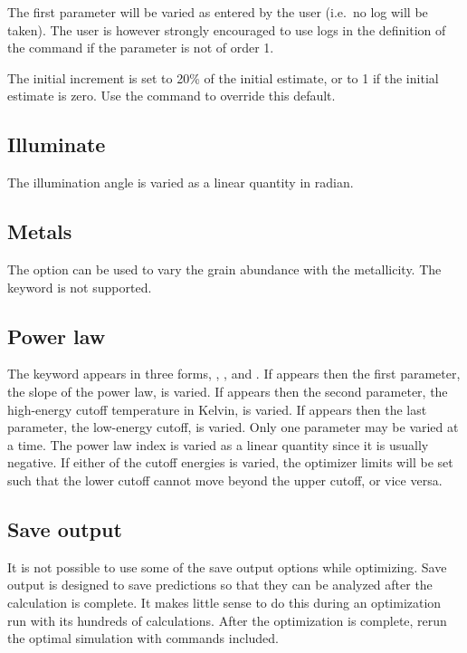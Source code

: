 The first parameter will be varied as entered by the user (i.e.\ no log will
be taken). The user is however strongly encouraged to use logs in the
definition of the command if the parameter is not of order 1.

The initial increment is set to 20\% of the initial estimate, or to 1 if the
initial estimate is zero. Use the  command to
override this default.

\subsection{Illuminate}

The illumination angle is varied as a linear quantity in radian.

\subsection{Metals}

The  option can be used to vary the
grain abundance with the metallicity. 
The keyword  is not supported.

\subsection{Power law}

The  keyword appears in three forms,
, , and .
If
 appears then the first parameter,
the slope of the power law, is varied.
If  appears then the second parameter,
the high-energy cutoff temperature in
Kelvin, is varied.
If  appears then the last parameter, the low-energy
cutoff, is varied.
Only one parameter may be varied at a time. The power law index is
varied as a linear quantity since it is usually negative.
If either of the cutoff energies is varied, the optimizer limits
will be set such that the lower cutoff cannot move beyond the upper
cutoff, or vice versa.

\subsection{Save output}

It is not possible to use some of the save output options while
optimizing.
Save output is designed to save predictions so that they can
be analyzed after the calculation is complete.
It makes little sense to
do this during an optimization run with its hundreds of calculations.  After
the optimization is complete, rerun the optimal simulation with
 commands included.


